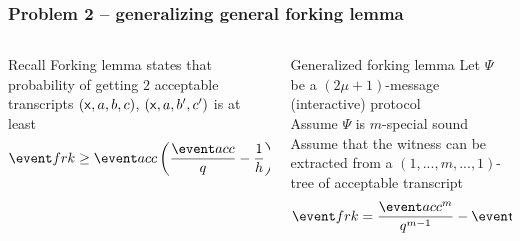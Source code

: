 \documentclass[aspectratio=169]{beamer}
\renewcommand{\myskip}{0.5\baselineskip}
\begin{document}
\begin{frame}
  \frametitle{Problem 2 -- generalizing general forking lemma}
      \begin{columns}[t]
      \begin{column}{.5\linewidth}
        \begin{block}{Recall}
          Forking lemma states that probability of getting $2$ acceptable
          transcripts $(\mathsf{x}, a, b, c)$, $(\mathsf{x}, a, b', c')$ is at least
    \[
      \frkProb \geq \accProb \left(\frac{\accProb}{q} - \frac{1}{h}\right).
    \]
  \end{block}\pause
\end{column}
\begin{column}{0.5\linewidth}
  \begin{block}{Generalized forking lemma}
    Let $\Psi$ be a $(2\mu + 1)$-message (interactive) protocol\\
    Assume $\Psi$ is $m$-special sound\\
    Assume that the witness can be extracted from a $(1, ..., m, ..., 1)$-tree
    of acceptable transcript\\[\myskip]

    \[
      \frkProb = \frac{\accProb^m}{q^{m - 1}} - \accProb \cdot \left(1 -
        \frac{h!}{(h - m)! \cdot h^{m}}\right).
    \]
  \end{block}
\end{column}
\end{columns}
\end{frame}

\newcommand{\zkproofs}{\zkproof_\simulator}
\newcommand{\inpa}{\inp_{\adv}}
\newcommand{\zkproofa}{\zkproof_\adv}
\newcommand{\exta}{\ext_\adv}
\end{document}
